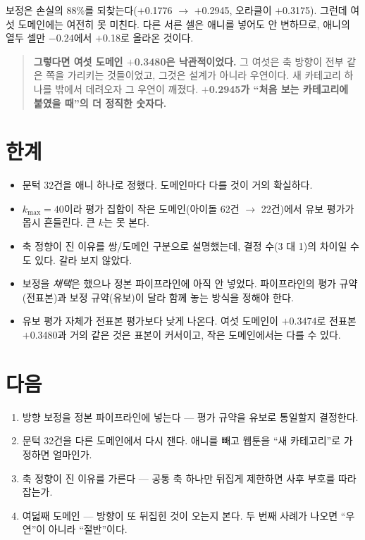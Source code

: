 \documentclass[10pt]{article}
\begin{document}
보정은 손실의 88\%를 되찾는다($+$0.1776 $\to$ $+$0.2945, 오라클이 $+$0.3175).
그런데 여섯 도메인에는 여전히 못 미친다. 다른 서른 셀은 애니를 넣어도 안
변하므로, 애니의 열두 셀만 $-$0.24에서 $+$0.18로 올라온 것이다.

\begin{quote}\fontsize{9.5}{11.5}\selectfont
\textbf{그렇다면 여섯 도메인 $+$0.3480은 낙관적이었다.} 그 여섯은 축 방향이
전부 같은 쪽을 가리키는 것들이었고, 그것은 설계가 아니라 우연이다. 새 카테고리
하나를 밖에서 데려오자 그 우연이 깨졌다. \textbf{$+$0.2945가 ``처음 보는
카테고리에 붙였을 때''의 더 정직한 숫자다.}
\end{quote}

\section{한계}

\begin{itemize}[leftmargin=1.1em,itemsep=0.15em]
\item 문턱 32건을 애니 하나로 정했다. 도메인마다 다를 것이 거의 확실하다.
\item $k_{\max}{=}40$이라 평가 집합이 작은 도메인(아이돌 62건 $\to$ 22건)에서
      유보 평가가 몹시 흔들린다. 큰 $k$는 못 본다.
\item 축 정향이 진 이유를 쌍/도메인 구분으로 설명했는데, 결정 수(3 대 1)의
      차이일 수도 있다. 갈라 보지 않았다.
\item 보정을 \emph{채택}은 했으나 정본 파이프라인에 아직 안 넣었다. 파이프라인의
      평가 규약(전표본)과 보정 규약(유보)이 달라 함께 놓는 방식을 정해야 한다.
\item 유보 평가 자체가 전표본 평가보다 낮게 나온다. 여섯 도메인이 $+$0.3474로
      전표본 $+$0.3480과 거의 같은 것은 표본이 커서이고, 작은 도메인에서는
      다를 수 있다.
\end{itemize}

\section{다음}

\begin{enumerate}[leftmargin=1.3em,itemsep=0.15em]
\item 방향 보정을 정본 파이프라인에 넣는다 --- 평가 규약을 유보로 통일할지
      결정한다.
\item 문턱 32건을 다른 도메인에서 다시 잰다. 애니를 빼고 웹툰을 ``새 카테고리''로
      가정하면 얼마인가.
\item 축 정향이 진 이유를 가른다 --- 공통 축 하나만 뒤집게 제한하면 사후 부호를
      따라잡는가.
\item 여덟째 도메인 --- 방향이 또 뒤집힌 것이 오는지 본다. 두 번째 사례가
      나오면 ``우연''이 아니라 ``절반''이다.
\end{enumerate}
\end{document}
